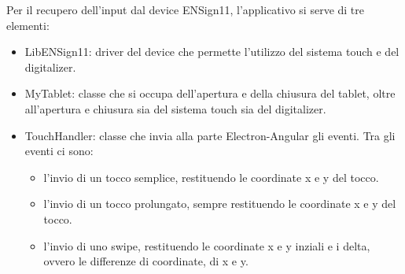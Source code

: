 Per il recupero dell'input dal device ENSign11, l'applicativo si serve di tre elementi:
\begin{itemize}
    \item LibENSign11: driver del device che permette l'utilizzo del sistema touch e del digitalizer.
    \item MyTablet: classe che si occupa dell'apertura e della chiusura del tablet, oltre all'apertura e chiusura sia del sistema touch sia del digitalizer.
    \item TouchHandler: classe che invia alla parte Electron-Angular gli eventi. Tra gli eventi ci sono: \begin{itemize}
        \item l'invio di un tocco semplice, restituendo le coordinate x e y del tocco.
        \item l'invio di un tocco prolungato, sempre restituendo le coordinate x e y del tocco.
        \item l'invio di uno swipe, restituendo le coordinate x e y inziali e i delta, ovvero le differenze di coordinate, di x e y. 
    \end{itemize}
\end{itemize}